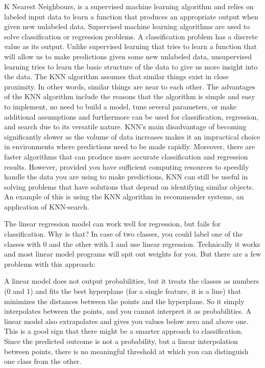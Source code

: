 \documentclass[12pt]{article}
\begin{document}
K Nearest Neighbours, is a supervised machine learning algorithm and relies on labeled input data to learn a function that produces an appropriate output when given new unlabeled data. Supervised machine learning algorithms are used to solve classification or regression problems. A classification problem has a discrete value as its output. Unlike supervised learning that tries to learn a function that will allow us to make predictions given some new unlabeled data, unsupervised learning tries to learn the basic structure of the data to give us more insight into the data. The KNN algorithm assumes that similar things exist in close proximity. In other words, similar things are near to each other. The advantages of the KNN algorithm include the reasons that the algorithm is simple and easy to implement, no need to build a model, tune several parameters, or make additional assumptions and furthermore can be used for classification, regression, and search due to its versatile nature. KNN’s main disadvantage of becoming significantly slower as the volume of data increases makes it an impractical choice in environments where predictions need to be made rapidly. Moreover, there are faster algorithms that can produce more accurate classification and regression results.
However, provided you have sufficient computing resources to speedily handle the data you are using to make predictions, KNN can still be useful in solving problems that have solutions that depend on identifying similar objects. An example of this is using the KNN algorithm in recommender systems, an application of KNN-search.


The linear regression model can work well for regression, but fails for classification. Why is that? In case of two classes, you could label one of the classes with 0 and the other with 1 and use linear regression. Technically it works and most linear model programs will spit out weights for you. But there are a few problems with this approach:

A linear model does not output probabilities, but it treats the classes as numbers (0 and 1) and fits the best hyperplane (for a single feature, it is a line) that minimizes the distances between the points and the hyperplane. So it simply interpolates between the points, and you cannot interpret it as probabilities. A linear model also extrapolates and gives you values below zero and above one. This is a good sign that there might be a smarter approach to classification. Since the predicted outcome is not a probability, but a linear interpolation between points, there is no meaningful threshold at which you can distinguish one class from the other. 
\end{document}
